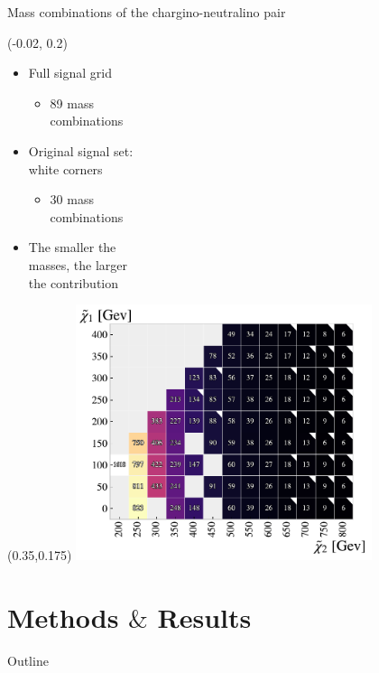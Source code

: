 \documentclass[UKenglish]{beamer}
\begin{document}
\begin{frame}{Mass combinations of the chargino-neutralino pair}
    \begin{textblock}{1}(-0.02, 0.2)
        \begin{itemize}
            \item Full signal grid
            \begin{itemize}
                \item 89 mass\\ combinations
            \end{itemize}
            \item Original signal set: \\white corners
            \begin{itemize}
                \item 30 mass \\combinations
            \end{itemize}
            \item The smaller the \\masses,
                  the larger\\ the contribution            
        \end{itemize}
    \end{textblock}
    \begin{textblock}{1.0}(0.35,0.175)
        \includegraphics[width=0.65\textwidth]{figures/Signal/NrSignalEvents.pdf}
    \end{textblock}
\end{frame}



\section{Methods $\&$ Results}
\begin{frame}{Outline}
    \tableofcontents[currentsection]
\end{frame}
\end{document}
